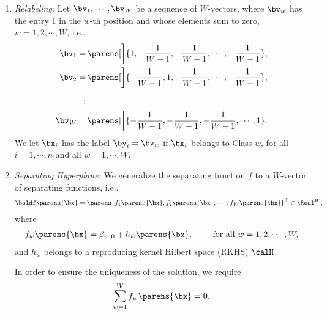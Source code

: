 \documentclass[12pt]{article}
\begin{document}
\begin{enumerate}[label=\textbf{\arabic*.}]
\begin{enumerate}
		\item \textit{Relabeling:} Let $\bv_1, \cdots, \bv_W$ be a sequence of $W$-vectors, where $\bv_w$ has the entry 1 in the $w$-th position and whose elements sum to zero, $w = 1, 2, \cdots, W$, i.e., 
		\begin{align*}
			\bv_1 = & \, \parens[\bigg]{1, -\frac{1}{W-1}, -\frac{1}{W-1}, \cdots, -\frac{1}{W-1}}, \\ 
			\bv_2 = & \, \parens[\bigg]{-\frac{1}{W-1}, 1, -\frac{1}{W-1}, \cdots, -\frac{1}{W-1}}, \\ 
			\vdots & \, \\ 
			\bv_W = & \, \parens[\bigg]{-\frac{1}{W-1}, -\frac{1}{W-1}, -\frac{1}{W-1}, \cdots, 1}. 
		\end{align*}
		We let $\bx_i$ has the label $\by_i = \bv_w$ if $\bx_i$ belongs to Class $w$, for all $i = 1, \cdots, n$ and all $w = 1, \cdots, W$. 
		
		\item \textit{Separating Hyperplane:} We generalize the separating function $f$ to a $W$-vector of separating functions, i.e., 
		\begin{align*}
			\boldf \parens{\bx} = \parens{f_1 \parens{\bx}, f_2 \parens{\bx}, \cdots, f_W \parens{\bx}}^\top \in \Real^W, 
		\end{align*}
		where 
		\begin{align*}
			f_w \parens{\bx} = \beta_{w,0} + h_w \parens{\bx}, \qquad \text{ for all } w = 1, 2, \cdots, W, 
		\end{align*}
		and $h_w$ belongs to a reproducing kernel Hilbert space (RKHS) $\calH$. 
		
		In order to ensure the uniqueness of the solution, we require 
		\begin{align}\label{eq-side-constraint}
			\sum_{w=1}^W f_w \parens{\bx} = 0. 
		\end{align}
		

\end{enumerate}
\end{enumerate}
\end{document}
